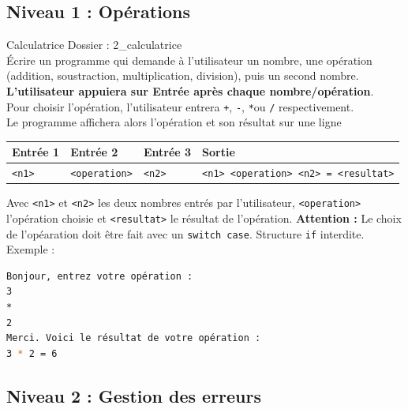 \subsection{Niveau 1 : Opérations}
\begin{UPSTIManipulation}{Calculatrice}
	Dossier : 2\_calculatrice\\
	Écrire un programme qui demande à l'utilisateur un nombre, une opération (addition, soustraction, multiplication, division), puis un second nombre. \textbf{L'utilisateur appuiera sur Entrée après chaque nombre/opération}.\\
	Pour choisir l'opération, l'utilisateur entrera \texttt{+}, \texttt{-}, \texttt{*}ou \texttt{/} respectivement.\\
	Le programme affichera alors l'opération et son résultat sur une ligne

	\begin{center}
		\begin{tabular}{|l|l|l|l|}
			\hline
			Entrée 1      & Entrée 2             & Entrée 3      & Sortie                                      \\
			\hline
			\texttt{<n1>} & \texttt{<operation>} & \texttt{<n2>} & \texttt{<n1> <operation> <n2> = <resultat>} \\
			\hline
		\end{tabular}
	\end{center}
	Avec \texttt{<n1>} et \texttt{<n2>} les deux nombres entrés par l'utilisateur, \texttt{<operation>} l'opération choisie et \texttt{<resultat>} le résultat de l'opération.
	\textbf{Attention :} Le choix de l'opéaration doit être fait avec un \texttt{switch case}. Structure \texttt{if} interdite.
	Exemple :
	\begin{lstlisting}[language=bash,style=console]
Bonjour, entrez votre opération : 
3
* 
2
Merci. Voici le résultat de votre opération : 
3 * 2 = 6
\end{lstlisting}
\end{UPSTIManipulation}

\subsection{Niveau 2 : Gestion des erreurs}

